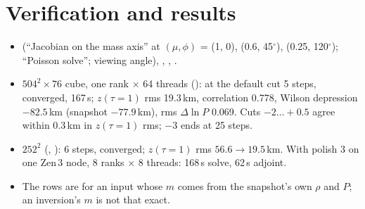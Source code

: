\adjointpoissontrue


\section{Verification and results}
\begin{itemize}
\item {} (``Jacobian on the mass axis'' at $(\mu,\phi)$ = (1, 0), (0.6, 45$^\circ$), (0.25, 120$^\circ$); ``Poisson
solve''; viewing angle), , , .
\item $504^2\times76$ cube, one rank $\times$ 64 threads (): at the default cut 5 steps,
converged, 167\,s; $z(\tau{=}1)$ rms 19.3\,km, correlation 0.778, Wilson depression $-82.5$\,km (snapshot $-77.9$\,km), rms
$\Delta\ln P$ 0.069. Cuts $-2\ldots+0.5$ agree within 0.3\,km in $z(\tau{=}1)$ rms; $-3$ ends  at 25 steps.
\item $252^2$ (, ): 6 steps, converged; $z(\tau{=}1)$ rms
$56.6\to19.5$\,km. With polish 3 on one Zen\,3 node, 8 ranks $\times$ 8 threads: 168\,s solve, 62\,s adjoint.
\item The rows are for an input whose $m$ comes from the snapshot's own $\rho$ and $P$; an inversion's $m$ is not that exact.
\end{itemize}

